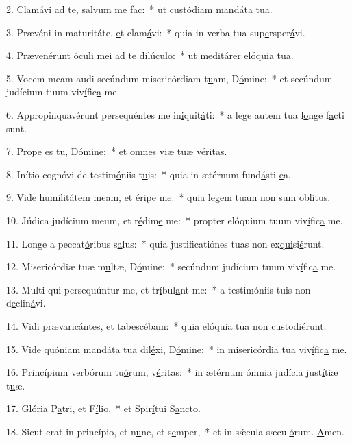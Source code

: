 2. Clamávi ad te, s\uline{a}lvum m\uline{e} fac:~* ut custódiam mand\uline{á}ta t\uline{u}a.\par 
3. Prævéni in maturitáte, \uline{e}t clam\uline{á}vi:~* quia in verba tua sup\uline{e}rsper\uline{á}vi.\par 
4. Prævenérunt óculi mei ad t\uline{e} dil\uline{ú}culo:~* ut meditárer el\uline{ó}quia t\uline{u}a.\par 
5. Vocem meam audi secúndum misericórdiam t\uline{u}am, D\uline{ó}mine:~* et secúndum judícium tuum viv\uline{í}fic\uline{a} me.\par 
6. Appropinquavérunt persequéntes me in\uline{i}quit\uline{á}ti:~* a lege autem tua l\uline{o}nge f\uline{a}cti sunt.\par 
7. Prope \uline{e}s tu, D\uline{ó}mine:~* et omnes viæ t\uline{u}æ v\uline{é}ritas.\par 
8. Inítio cognóvi de testim\uline{ó}niis t\uline{u}is:~* quia in ætérnum fund\uline{á}sti \uline{e}a.\par 
9. Vide humilitátem meam, et \uline{é}rip\uline{e} me:~* quia legem tuam non s\uline{u}m obl\uline{í}tus.\par 
10. Júdica judícium meum, et r\uline{é}dim\uline{e} me:~* propter elóquium tuum viv\uline{í}fic\uline{a} me.\par 
11. Longe a peccat\uline{ó}ribus s\uline{a}lus:~* quia justificatiónes tuas non ex\uline{qui}si\uline{é}runt.\par 
12. Misericórdiæ tuæ m\uline{u}ltæ, D\uline{ó}mine:~* secúndum judícium tuum viv\uline{í}fic\uline{a} me.\par 
13. Multi qui persequúntur me, et tr\uline{í}bul\uline{a}nt me:~* a testimóniis tuis non d\uline{e}clin\uline{á}vi.\par 
14. Vidi prævaricántes, et t\uline{a}besc\uline{é}bam:~* quia elóquia tua non cust\uline{o}di\uline{é}runt.\par 
15. Vide quóniam mandáta tua dil\uline{é}xi, D\uline{ó}mine:~* in misericórdia tua viv\uline{í}fic\uline{a} me.\par 
16. Princípium verbórum tu\uline{ó}rum, v\uline{é}ritas:~* in ætérnum ómnia judícia just\uline{í}tiæ t\uline{u}æ.\par 
17. Glória P\uline{a}tri, et F\uline{í}lio,~* et Spir\uline{í}tui S\uline{a}ncto.\par 
18. Sicut erat in princípio, et n\uline{u}nc, et s\uline{e}mper,~* et in sǽcula sæcul\uline{ó}rum. \uline{A}men.\par 
